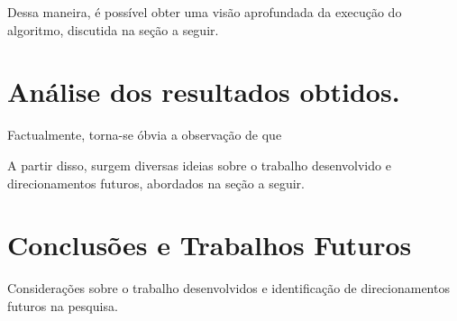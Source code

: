 \documentclass[12pt]{article}
\begin{document}
Dessa maneira, é possível obter uma visão aprofundada da execução do algoritmo, discutida na seção a seguir.

\section{Análise dos resultados obtidos.}

Factualmente, torna-se óbvia a observação de que


A partir disso, surgem diversas ideias sobre o trabalho desenvolvido e direcionamentos futuros, abordados na seção a seguir.

\section{Conclusões e Trabalhos Futuros}\label{sec:figs}


Considerações sobre o trabalho desenvolvidos e identificação de direcionamentos futuros na
pesquisa.





\end{document}
